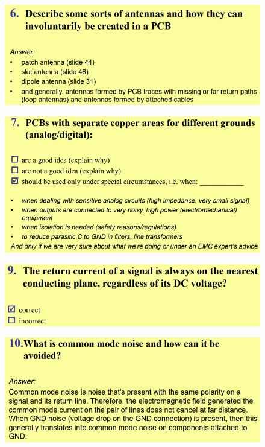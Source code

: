 \documentclass[resume]{subfiles}
\begin{document}
\begin{multicols}{3}
\begin{figure}[H]
\end{figure}
\begin{figure}[H]
\centering
\includegraphics[width=\columnwidth]{img_88.png}
\end{figure}
\begin{figure}[H]
\centering
\includegraphics[width=\columnwidth]{img_89.png}
\end{figure}
\begin{figure}[H]
\centering
\includegraphics[width=\columnwidth]{img_90.png}
\end{figure}
\begin{figure}[H]
\centering
\includegraphics[width=\columnwidth]{img_91.png}
\end{figure}


\end{multicols}
\end{document}
